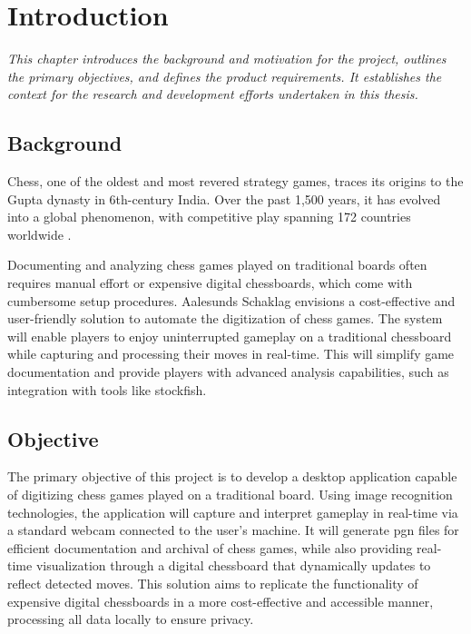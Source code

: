 \chapter{Introduction}

\begin{center} \textit{This chapter introduces the background and motivation for the project, outlines the primary objectives, and defines the product requirements. It establishes the context for the research and development efforts undertaken in this thesis.}
\end{center}

\section{Background}

Chess, one of the oldest and most revered strategy games, traces its origins to the Gupta dynasty in 6th-century India. Over the past 1,500 years, it has evolved into a global phenomenon, with competitive play spanning 172 countries worldwide \cite{artsnculture}. \

Documenting and analyzing chess games played on traditional boards often requires manual effort or expensive digital chessboards, which come with cumbersome setup procedures. Aalesunds Schaklag envisions a cost-effective and user-friendly solution to automate the digitization of chess games.  The system will enable players to enjoy uninterrupted gameplay on a traditional chessboard while capturing and processing their moves in real-time. This will simplify game documentation and provide players with advanced analysis capabilities, such as integration with tools like \gls{stockfish}.

\section{Objective}

The primary objective of this project is to develop a desktop application capable of digitizing chess games played on a traditional board. Using image recognition technologies, the application will capture and interpret gameplay in real-time via a standard webcam connected to the user's machine. It will generate \gls{pgn} files for efficient documentation and archival of chess games, while also providing real-time visualization through a digital chessboard that dynamically updates to reflect detected moves. This solution aims to replicate the functionality of expensive digital chessboards in a more cost-effective and accessible manner, processing all data locally to ensure privacy.

